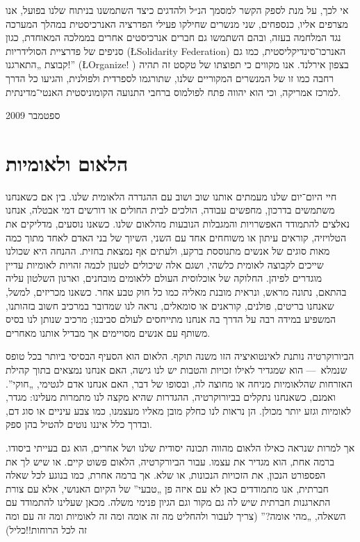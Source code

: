 אי לכך, על מנת לספק הקשר למסמך הנ״ל   ולהדגים כיצד השתמשנו בניתוח שלנו בפועל, אנו מצרפים אליו, כנספחים, שני מנשרים שחילקו פעילי הפדרציה האנרכיסטית במהלך המערכה נגד המלחמה בעזה, ובהם השתמשו גם חברים אנרכיסטים אחרים בממלכה המאוחדת, כגון סניפים של פדרציית הסולידריות (\L{Solidarity Federation}) האנרכו־סינדיקליסטית, כמו גם קבוצת „התארגנו!”  (\L{Organize!} ) בצפון אירלנד. אנו מקווים כי תפוצתו של טקסט זה תהיה רחבה כמו זו של המנשרים המקוריים שלנו, שתורגמו לספרדית ולפולנית, והגיעו כל הדרך למרכז אמריקה, וכי הוא יהווה פתח לפולמוס ברחבי התנועה הקומוניסטית האנטי־מדינתית.

ספטמבר 2009

\section*{הלאום ולאומיות}

חיי היום־יום שלנו מעמתים אותנו שוב ושוב עם ההגדרה הלאומית שלנו. בין אם כשאנחנו משתמשים בדרכון, מחפשים עבודה, הולכים לבית החולים או דורשים דמי אבטלה, אנחנו נאלצים להתמודד האפשרויות והמגבלות הנובעות מהלאום שלנו. כשאנו נוסעים, מדליקים את הטלויזיה, קוראים עיתון או משוחחים אחד עם השני, השיוך של בני האדם לאחד מתוך כמה מאות סוגים של אנשים מתנוססת ברקע, ולעתים אף נמצאת בחזית. ההנחה היא שכולנו שייכים לקבוצה לאומית כלשהי, ושגם אלה שיכולים לטעון לכמה זהויות לאומיות עדיין מוגדרים לפיהן. החלוקה של אוכלוסית העולם ללאומים מובחנים, וארגון השלטון עליה בהתאם, נתונה מראש, ונראית מובנת מאליה כמו כל חוק טבע אחר. כשאנו מכריזים, למשל, שאנחנו בריטים, פולנים, קוראנים או סומאלים, נראה לנו שמדובר במרכיב חשוב בזהותנו, המשפיע במידה רבה על הדרך בה אנחנו מתייחסים לעולם סביבנו; מרכיב שנותן לנו בסיס משותף עם אנשים מסויימים אך מבדיל אותנו מאחרים.

הביורוקרטיה נותנת לאינטואיציה הזו משנה תוקף. הלאום הוא הסעיף הבסיסי ביותר בכל טופס שנמלא~— הוא שמגדיר לאילו זכויות והטבות יש לנו גישה, האם אנחנו נמצאים בתוך קהילת האזרחות שהלאומיות מניחה או מחוצה לה, ובסופו של דבר, האם אנחנו אדם לגטימי, „חוקי”. ואמנם, כשאנחנו נתקלים בביורוקרטיה, ההגדרות שהיא מקצה לנו מתמרות מעלינו: מגדר, לאומיות וגזע יותר מכולן. הן נראות לנו כחלק מובן מאליו מעצמנו, כמו צבע עיניים או סוג דם, ובדרך כלל איננו נוטים להטיל בהן ספק.

אך למרות שנראה כאילו הלאום מהווה תכונה יסודית שלנו ושל אחרים, הוא גם בעייתי ביסודו. ברמה אחת, הוא מגדיר את עצמו. עבור הביורקרטיה, הלאום פשוט קיים. או שיש לך את הפספורט הנכון, את הזכויות הנכונות, או שלא. אך ברמה אחרת, כמו בנוגע לכל שאלה חברתית, אנו מתמודדים כאן לא עם איזה פן „טבעי” של הקיום האנושי, אלא עם צורת התארגנות חברתית שיש לה גם מקור וגם הגיון פנימי משלה. מכאן שעלינו להתמודד עם השאלה, „מהי אומה?” (צריך לעבור ולהחליט מה זה אומה ומה זה לאומיות ומה זה עם ומה זה לכל הרוחות!!כליל)

